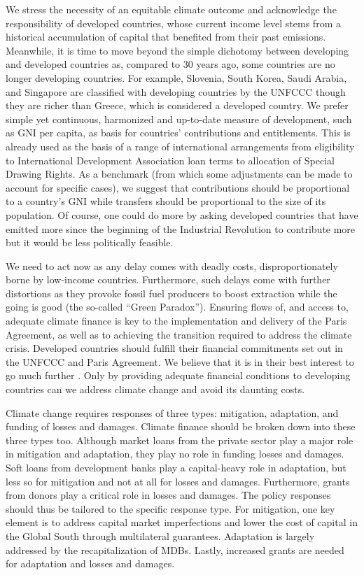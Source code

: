 \documentclass[12pt,english]{article}
\begin{document}
\begin{bibunit}
We stress the necessity of an equitable climate outcome and acknowledge the responsibility of developed countries, whose current income level stems from a historical accumulation of capital that benefited from their past emissions. Meanwhile, it is time to move beyond the simple dichotomy between developing and developed countries as, compared to 30 years ago, some countries are no longer developing countries. For example, Slovenia, South Korea, Saudi Arabia, and Singapore are classified with developing countries by the UNFCCC though they are richer than Greece, which is considered a developed country. We prefer simple yet continuous, harmonized and up-to-date measure of development, such as GNI per capita, as basis for countries' contributions and entitlements. This is already used as the basis of a range of international arrangements from eligibility to International Development Association loan terms to allocation of Special Drawing Rights. As a benchmark (from which some adjustments can be made to account for specific cases), we suggest that contributions should be proportional to a country's GNI while transfers should be proportional to the size of its population. Of course, one could do more by asking developed countries that have emitted more since the beginning of the Industrial Revolution to contribute more but it would be less politically feasible.

We need to act now as any delay comes with deadly costs, disproportionately borne by low-income countries. Furthermore, such delays come with further distortions as they provoke fossil fuel producers to boost extraction while the going is good (the so-called ``Green Paradox''). Ensuring flows of, and access to, adequate climate finance is key to the implementation and delivery of the Paris Agreement, as well as to achieving the transition required to address the climate crisis. Developed countries should fulfill their financial commitments set out in the UNFCCC and Paris Agreement. We believe that it is in their best interest to go much further \citep{bolton_why_2025}. Only by providing adequate financial conditions to developing countries can we address climate change and avoid its daunting costs.

Climate change requires responses of three types: mitigation, adaptation, and funding of losses and damages. Climate finance should be broken down into these three types too. Although market loans from the private sector play a major role in mitigation and adaptation, they play no role in funding losses and damages. Soft loans from development banks play a capital-heavy role in adaptation, but less so for mitigation and not at all for losses and damages. Furthermore, grants from donors play a critical role in losses and damages. The policy responses should thus be tailored to the specific response type. For mitigation, one key element is to address capital market imperfections and lower the cost of capital in the Global South through multilateral guarantees. Adaptation is largely addressed by the recapitalization of MDBs. Lastly, increased grants are needed for adaptation and losses and damages.


\end{bibunit}
\end{document}
